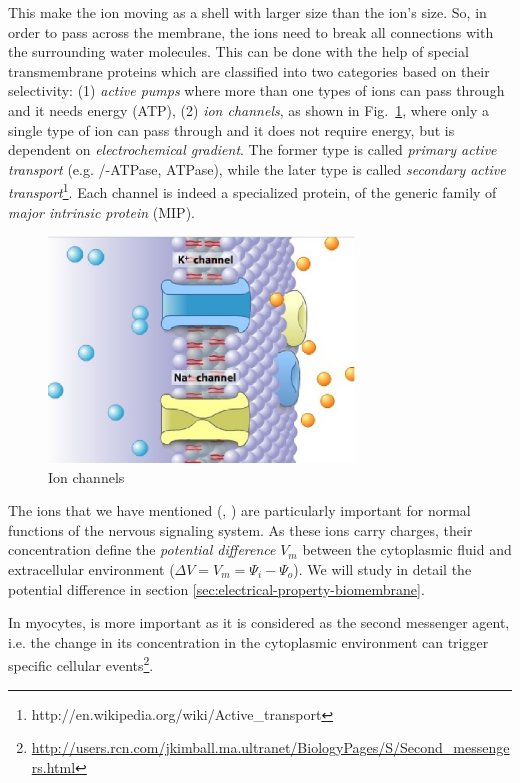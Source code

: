 This make the ion moving as a shell with larger size than the ion's
size. So, in order to pass across the membrane, the ions need to break
all connections with the surrounding water molecules. This can be done
with the help of special transmembrane proteins which are classified
into two categories based on their selectivity: (1) {\it active pumps}
where more than one types of ions can pass through and it needs energy
(ATP), (2) {\it ion channels}, as shown in Fig.~\ref{fig:ion-channel},
where only a single type of ion can pass through and it does not
require energy, but is dependent on {\it electrochemical gradient}.
The former type is called {\it primary active transport}
(e.g. /-ATPase,  ATPase), while the later
type is called
{\it secondary active
  transport}\footnote{http://en.wikipedia.org/wiki/Active\_transport}.
Each channel is indeed a specialized protein, of the generic family of
{\it major intrinsic protein} (MIP).

\begin{figure}[htb]
  \centerline{\includegraphics[height=6cm]{./images/ion-channels.eps}}
  \caption{Ion channels}\label{fig:ion-channel}
\end{figure}

The ions that we have mentioned
(, ) are particularly important for normal functions of
  the nervous signaling system. As these ions carry charges, their
  concentration define the {\it potential difference}  $V_m$
  between the cytoplasmic fluid and extracellular environment ($\Delta
  V = V_m = \Psi_i-\Psi_o$). We will study in detail the
  potential difference in section \ref{sec:electrical-property-biomembrane}.  

  \begin{framed}
    In
    myocytes,  is more important as it is considered as the
    second messenger agent, i.e. the change in its concentration in the
    cytoplasmic environment can trigger specific cellular
    events\footnote{\url{http://users.rcn.com/jkimball.ma.ultranet/BiologyPages/S/Second_messengers.html}}.
  \end{framed}

